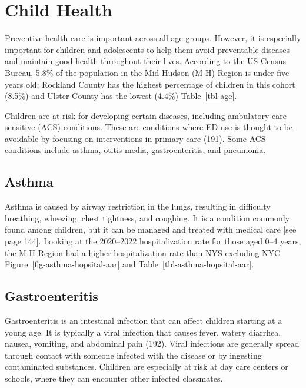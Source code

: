 \documentclass[
  english,
  letterpaper,
]{report}
\begin{document}

\chapter{Child Health}\label{child-health}

Preventive health care is important across all age groups. However, it
is especially important for children and adolescents to help them avoid
preventable diseases and maintain good health throughout their lives.
According to the US Census Bureau, 5.8\% of the population in the
Mid-Hudson (M-H) Region is under five years old; Rockland County has the
highest percentage of children in this cohort (8.5\%) and Ulster County
has the lowest (4.4\%) Table~\ref{tbl-age}.

Children are at risk for developing certain diseases, including
ambulatory care sensitive (ACS) conditions. These are conditions where
ED use is thought to be avoidable by focusing on interventions in
primary care (191). Some ACS conditions include asthma, otitis media,
gastroenteritis, and pneumonia.

\section{Asthma}\label{asthma-1}

Asthma is caused by airway restriction in the lungs, resulting in
difficulty breathing, wheezing, chest tightness, and coughing. It is a
condition commonly found among children, but it can be managed and
treated with medical care {[}see page 144{]}. Looking at the 2020--2022
hospitalization rate for those aged 0--4 years, the M-H Region had a
higher hospitalization rate than NYS excluding NYC
Figure~\ref{fig-asthma-hopsital-aar} and
Table~\ref{tbl-asthma-hopsital-aar}.

\section{Gastroenteritis}\label{gastroenteritis}

Gastroenteritis is an intestinal infection that can affect children
starting at a young age. It is typically a viral infection that causes
fever, watery diarrhea, nausea, vomiting, and abdominal pain (192).
Viral infections are generally spread through contact with someone
infected with the disease or by ingesting contaminated substances.
Children are especially at risk at day care centers or schools, where
they can encounter other infected classmates.
\end{document}
